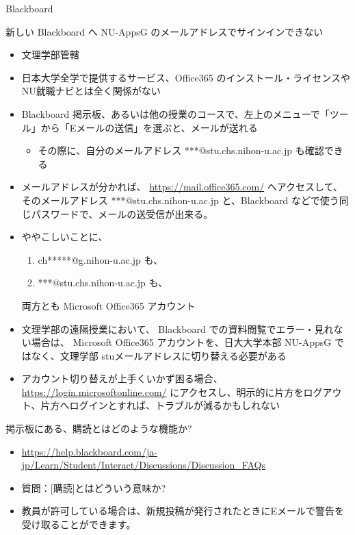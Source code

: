 \documentclass[a4j,10pt]{jsarticle}
\begin{document}
{\begin{frame}[label={sec:orgc119bb0},fragile]{Blackboard}
\begin{block}{新しい Blackboard へ NU-AppsG のメールアドレスでサインインできない}
\begin{itemize}
\begin{itemize}
\item 文理学部管轄
\item 日本大学全学で提供するサービス、Office365 のインストール・ライセンスや NU就職ナビとは全く関係がない
\item Blackboard 掲示板、あるいは他の授業のコースで、左上のメニューで「ツール」から「Eメールの送信」を選ぶと、メールが送れる
\begin{itemize}
\item その際に、自分のメールアドレス ***@stu.chs.nihon-u.ac.jp も確認できる
\end{itemize}
\item メールアドレスが分かれば、 \url{https://mail.office365.com/} へアクセスして、そのメールアドレス ***@stu.chs.nihon-u.ac.jp と、Blackboard などで使う同じパスワードで、メールの送受信が出来る。
\end{itemize}
\end{itemize}
\par
\begin{itemize}
\item ややこしいことに、
\begin{enumerate}
\item ch*****@g.nihon-u.ac.jp も、
\item ***@stu.chs.nihon-u.ac.jp も、
\end{enumerate}
両方とも Microsoft Office365 アカウント
\par
\item 文理学部の遠隔授業において、 Blackboard での資料閲覧でエラー・見れない場合は、
Microsoft Office365 アカウントを、日大大学本部 NU-AppsG ではなく、文理学部 stuメールアドレスに切り替える必要がある
\par
\item アカウント切り替えが上手くいかず困る場合、 \url{https://login.microsoftonline.com/} にアクセスし、明示的に片方をログアウト、片方へログインとすれば、トラブルが減るかもしれない
\end{itemize}
\end{block}
\par
\begin{block}{掲示板にある、購読とはどのような機能か?}
\begin{itemize}
\item \url{https://help.blackboard.com/ja-jp/Learn/Student/Interact/Discussions/Discussion\_FAQs}
\item 質問：[購読]とはどういう意味か?
\item 教員が許可している場合は、新規投稿が発行されたときにEメールで警告を受け取ることができます。

\end{itemize}
\end{block}
\end{frame}}
\end{document}
